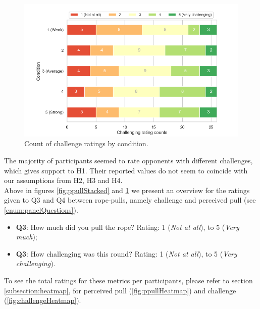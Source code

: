 \begin{figure}[H]
\captionsetup{justification=centering,margin=0.1cm}
 \centering
 \hspace{-20mm}
\includegraphics[scale=0.7]{Files/Plots/challenge_by_condition_count_staked.png}
\caption{Count of challenge ratings by condition.}
\label{fig:challengeStacked}
\end{figure}
\pagebreak
The majority of participants seemed to rate opponents with different challenges, which gives support to H1. Their reported values do not seem to coincide with our assumptions from H2, H3 and H4.
\\
Above in figures \ref{fig:ppullStacked} and 
\ref{fig:challengeStacked} we present an overview for the ratings given to Q3 and Q4 between rope-pulls, namely challenge and perceived pull (see \ref{enum:panelQuestions}). 
\begin{itemize}
\itemsep0em
 \item \textbf{Q3}: How much did you pull the rope? Rating: 1 (\textit{Not at all}), to 5 (\textit{Very much});
\item \textbf{Q3}: How challenging was this round? Rating: 1 (\textit{Not at all}), to 5 (\textit{Very challenging}).
\end{itemize}
To see the total ratings for these metrics per participants, please refer to section \ref{subsection:heatmap}, for perceived pull (\ref{fig:ppullHeatmap}) and challenge (\ref{fig:challengeHeatmap}).

